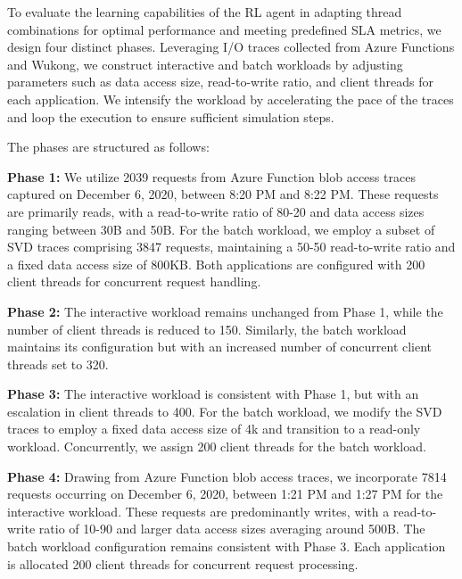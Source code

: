 \label{appendix:c}

To evaluate the learning capabilities of the RL agent in adapting thread combinations for optimal performance and meeting predefined SLA metrics, we design four distinct phases. Leveraging I/O traces collected from Azure Functions and Wukong, we construct interactive and batch workloads by adjusting parameters such as data access size, read-to-write ratio, and client threads for each application. We intensify the workload by accelerating the pace of the traces and loop the execution to ensure sufficient simulation steps.

The phases are structured as follows:

\textbf{Phase 1:} We utilize 2039 requests from Azure Function blob access traces captured on December 6, 2020, between 8:20 PM and 8:22 PM. These requests are primarily reads, with a read-to-write ratio of 80-20 and data access sizes ranging between 30B and 50B. For the batch workload, we employ a subset of SVD traces comprising 3847 requests, maintaining a 50-50 read-to-write ratio and a fixed data access size of 800KB. Both applications are configured with 200 client threads for concurrent request handling.

\textbf{Phase 2:} The interactive workload remains unchanged from Phase 1, while the number of client threads is reduced to 150. Similarly, the batch workload maintains its configuration but with an increased number of concurrent client threads set to 320.

\textbf{Phase 3:} The interactive workload is consistent with Phase 1, but with an escalation in client threads to 400. For the batch workload, we modify the SVD traces to employ a fixed data access size of 4k and transition to a read-only workload. Concurrently, we assign 200 client threads for the batch workload.

\textbf{Phase 4:} Drawing from Azure Function blob access traces, we incorporate 7814 requests occurring on December 6, 2020, between 1:21 PM and 1:27 PM for the interactive workload. These requests are predominantly writes, with a read-to-write ratio of 10-90 and larger data access sizes averaging around 500B. The batch workload configuration remains consistent with Phase 3. Each application is allocated 200 client threads for concurrent request processing.



